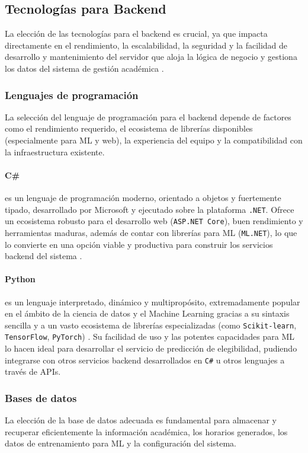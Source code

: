 \subsection{Tecnologías para Backend}
La elección de las tecnologías para el backend es crucial, ya que impacta directamente en el rendimiento, la escalabilidad, la seguridad y la facilidad de desarrollo y mantenimiento del servidor que aloja la lógica de negocio y gestiona los datos del sistema de gestión académica \parencite{FowlerBackend}.

\subsubsection{Lenguajes de programación}
La selección del lenguaje de programación para el backend depende de factores como el rendimiento requerido, el ecosistema de librerías disponibles (especialmente para ML y web), la experiencia del equipo y la compatibilidad con la infraestructura existente.

\paragraph{C\#}
es un lenguaje de programación moderno, orientado a objetos y fuertemente tipado, desarrollado por Microsoft y ejecutado sobre la plataforma \texttt{.NET}.
Ofrece un ecosistema robusto para el desarrollo web (\texttt{ASP.NET Core}), buen rendimiento y herramientas maduras, además de contar con librerías para ML (\texttt{ML.NET}), lo que lo convierte en una opción viable y productiva para construir los servicios backend del sistema \parencite{MicrosoftCSharp}.

\paragraph{Python}
es un lenguaje interpretado, dinámico y multipropósito, extremadamente popular en el ámbito de la ciencia de datos y el Machine Learning gracias a su sintaxis sencilla y a un vasto ecosistema de librerías especializadas (como \texttt{Scikit-learn}, \texttt{TensorFlow}, \texttt{PyTorch}) \parencite{PythonSoftwareFoundation}.
Su facilidad de uso y las potentes capacidades para ML lo hacen ideal para desarrollar el servicio de predicción de elegibilidad, pudiendo integrarse con otros servicios backend desarrollados en \texttt{C\#} u otros lenguajes a través de APIs.

\subsubsection{Bases de datos}
La elección de la base de datos adecuada es fundamental para almacenar y recuperar eficientemente la información académica, los horarios generados, los datos de entrenamiento para ML y la configuración del sistema.

